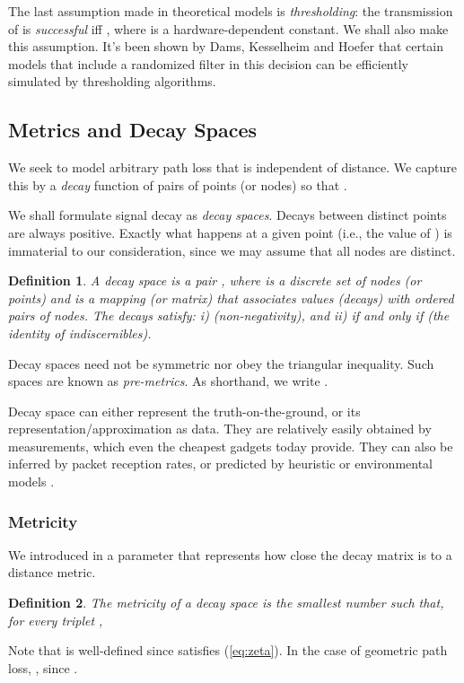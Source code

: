 \documentclass[11pt]{amsart}
\newtheorem{definition}{Definition}[section]
\begin{document}
The last assumption made in theoretical models is \emph{thresholding}:
the transmission of  is \emph{successful} iff , where  is a hardware-dependent constant.  We shall
also make this assumption. It's been shown by Dams, Kesselheim and
Hoefer \cite{Dams2012} that certain models that include a randomized
filter in this decision can be efficiently simulated by thresholding
algorithms.

\subsection{Metrics and Decay Spaces}
\label{sec:decayspaces}

We seek to model arbitrary path loss that is independent of distance.
We capture this by a \emph{decay} function  of pairs of points (or
nodes) so that .

We shall formulate signal decay as \emph{decay spaces}.  Decays
between distinct points are always positive.  Exactly what happens at
a given point (i.e., the value of ) is immaterial to our
consideration, since we may assume that all nodes are distinct.  



\begin{definition}
  A \emph{decay space} is a pair , where  is a
  discrete set of nodes (or points) and  is a mapping (or matrix)  that associates values (\emph{decays}) with
  ordered pairs of nodes.  The decays satisfy: i) 
  (non-negativity), and ii)  if and only if  (the
  identity of indiscernibles).
\end{definition}

Decay spaces need not be symmetric nor obey the triangular inequality.
Such spaces are known as \emph{pre-metrics}.
As shorthand, we write .



Decay space can either represent the truth-on-the-ground, or
its representation/approximation as data. They are relatively easily obtained by measurements, which even the cheapest gadgets today provide. 
They can also be inferred by packet reception rates, or predicted by heuristic  or environmental models \cite{Goldsmith}.

\subsubsection*{Metricity}
We introduced in \cite{us:ICDCS14} a parameter that represents how close the decay matrix is to a distance metric. 
\begin{definition}
The \emph{metricity}  of a decay space  is
the smallest number such that, for every triplet ,
  
\end{definition}
Note that  is well-defined since  satisfies (\ref{eq:zeta}).
In the case of geometric path loss, , since
. 
\end{document}
